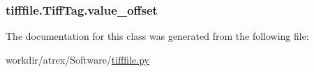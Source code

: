 \hypertarget{classtifffile_1_1_tiff_tag_ac86aee4a1ef18fc194e4f0c753f74002}{
\subsubsection[{value\-\_\-offset}]{\setlength{\rightskip}{0pt plus 5cm}tifffile.\-Tiff\-Tag.\-value\-\_\-offset}}\label{classtifffile_1_1_tiff_tag_ac86aee4a1ef18fc194e4f0c753f74002}


The documentation for this class was generated from the following file\-:\begin{DoxyCompactItemize}
\item 
workdir/atrex/\-Software/\hyperlink{tifffile_8py}{tifffile.\-py}\end{DoxyCompactItemize}
